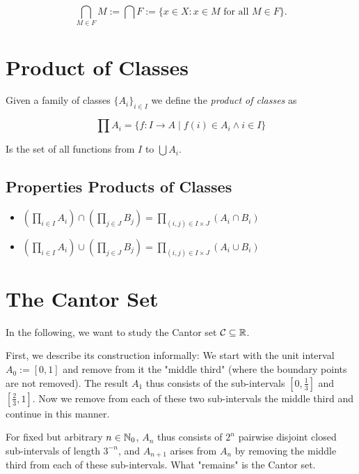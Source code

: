 \[
	\bigcap_{M \in F} M := \bigcap F := \{ x \in X : x \in M \text{ for all } M \in F \} .
\]


\section{Product of Classes}

Given a family of classes \(\{A_i\}_{i \in I}\) we define the \emph{product of classes} as

\[
	\prod A_i = \{f: I \to A \mid f(i) \in A_i \land i \in I\}
\]

Is the set of all functions from \(I\) to \(\bigcup A_i\).

\subsection{Properties Products of Classes}

\begin{itemize}

	\item \(\left(\prod_{i \in I} A_i\right) \cap \left(\prod_{j \in J} B_j\right) = \prod_{(i, j) \in I \times J}(A_i \cap B_i)\)

	\item \(\left(\prod_{i \in I} A_i\right) \cup \left(\prod_{j \in J} B_j\right) = \prod_{(i, j) \in I \times J}(A_i \cup B_i)\)

\end{itemize}

\section{The Cantor Set}

In the following, we want to study the Cantor set \(\mathcal{C}\subseteq\mathbb{R}\).

First, we describe its construction informally: We start with the unit interval \(A_0:=[0,1]\) and remove from it the "middle third" (where the boundary points are not removed).
The result \(A_1\) thus consists of the sub-intervals \(\left[0,\frac{1}{3}\right]\) and \(\left[\frac{2}{3},1\right]\).
Now we remove from each of these two sub-intervals the middle third and continue in this manner.

For fixed but arbitrary \(n\in\mathbb{N}_0\), \(A_n\) thus consists of \(2^n\) pairwise disjoint closed sub-intervals of length \(3^{-n}\),
and \(A_{n+1}\) arises from \(A_n\) by removing the middle third from each of these sub-intervals. What "remains" is the Cantor set.

